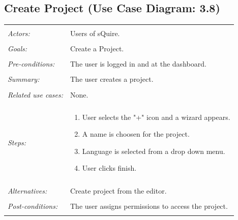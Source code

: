 \documentclass[11pt]{report}
\begin{document}
\subsection{Create Project (Use Case Diagram: 3.8)}
\begin{tabular}{ p{2cm} p{12cm} }
 \hline
 \\
 \textit{Actors:} & Users of sQuire. \\ 
 \\
 \textit{Goals:} & Create a Project. \\
 \\
 \textit{Pre-conditions:} & The user is logged in and at the dashboard. \\
 \\
 \textit{Summary:} & The user creates a project. \\ 
 \\
 \textit{Related use cases:} & None. \\ 
 \\
 \textit{Steps:} & \begin{enumerate}
  \item User selects the "+" icon and a wizard appears.
  \item A name is choosen for the project.
  \item Language is selected from a drop down menu.
  \item User clicks finish.
 \end{enumerate} \\
 \\
 \textit{Alternatives:} & Create project from the editor. \\
 \\
 \textit{Post-conditions:} & The user assigns permissions to access the project. \\
 \\
\hline
\end{tabular}
\end{document}
